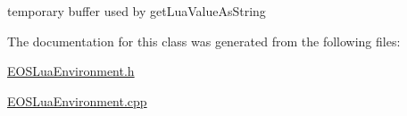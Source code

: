 temporary buffer used by getLuaValueAsString 



The documentation for this class was generated from the following files:\begin{CompactItemize}
\item 
\hyperlink{EOSLuaEnvironment_8h}{EOSLuaEnvironment.h}\item 
\hyperlink{EOSLuaEnvironment_8cpp}{EOSLuaEnvironment.cpp}\end{CompactItemize}
